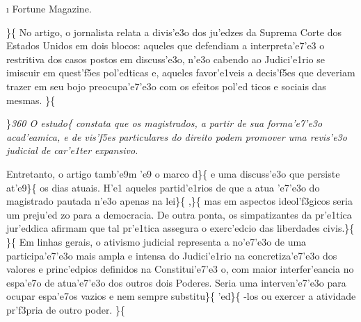 \ai{} \ltrch{} \i{} Fortune Magazine.
\par \}\{\rtlch{}  \ltrch{} 
\tab No artigo, o jornalista relata a divis'e3o dos ju'edzes da Suprema
Corte dos Estados Unidos em dois blocos: aqueles que defendiam a
interpreta'e7'e3 o restritiva dos casos postos em discuss'e3o, n'e3o
cabendo ao Judici'e1rio se imiscuir em quest'f5es pol'edticas e, aqueles
favor'e1veis a decis'f5es que deveriam trazer em seu bojo
preocupa'e7'e3o com os efeitos pol'ed ticos e sociais das mesmas.
\}\{\rtlch{}  \ltrch{} 
\par \}\pard \ltrpar\qj {}\sl360\widctlpar\wrapdefault\faauto{} {\rtlch{}  \ltrch{}  O estudo}\{\rtlch{}
 \ltrch{}  constata que os
magistrados, a partir de sua forma'e7'e3o acad'eamica, e de vis'f5es
particulares do direito podem promover uma revis'e3o judicial de
car'e1ter expansivo. \par Entretanto, o artigo tamb'e9m 'e9 o marco
d\}\{\rtlch{}  \ltrch{}  e uma discuss'e3o que
persiste at'e9\}\{\rtlch{}  \ltrch{}
 os dias atuais. H'e1 aqueles
partid'e1rios de que a atua 'e7'e3o do magistrado pautada n'e3o apenas
na lei\}\{\rtlch{}  \ltrch{}  ,\}\{\rtlch{}
 \ltrch{}  mas em aspectos
ideol'f3gicos seria um preju'ed zo para a democracia. De outra ponta, os
simpatizantes da pr'e1tica jur'eddica afirmam que tal pr'e1tica assegura
o exerc'edcio das liberdades civis.\}\{\rtlch{}  \ltrch{}
 \}\{\rtlch{}  \ltrch{}
 Em linhas gerais, o ativismo judicial
representa a no'e7'e3o de uma participa'e7'e3o mais ampla e intensa do
Judici'e1rio na concretiza'e7'e3o dos valores e princ'edpios definidos
na Constitui'e7'e3 o, com maior interfer'eancia no espa'e7o de
atua'e7'e3o dos outros dois Poderes. Seria uma interven'e7'e3o para
ocupar espa'e7os vazios e nem sempre substitu\}\{\rtlch{} 
\ltrch{}  'ed\}\{\rtlch{}  \ltrch{}
 -los ou exercer a atividade pr'f3pria
de outro poder. \}\{\rtlch{}  \ltrch{} 
